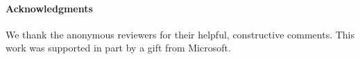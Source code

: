 \documentclass[conference]{IEEEtran}
\begin{document}





% 




\bigskip

\paragraph*{Acknowledgments}
We thank the anonymous reviewers for their helpful, constructive
comments. This work was supported in part by a gift from Microsoft. 

\end{document}
